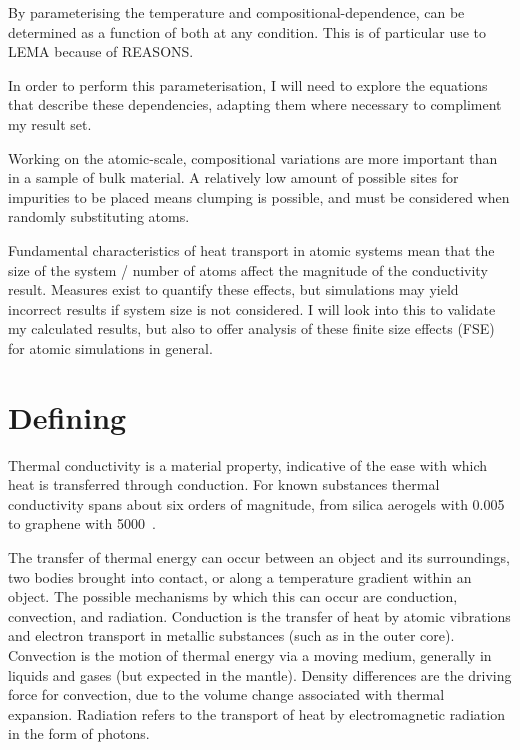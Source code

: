 By parameterising the temperature and compositional-dependence, \tcs can be determined as a function of both at any condition. This is of particular use to LEMA because of REASONS. 

In order to perform this parameterisation, I will need to explore the equations that describe these dependencies, adapting them where necessary to compliment my result set.

Working on the atomic-scale, compositional variations are more important than in a sample of bulk material. A relatively low amount of possible sites for impurities to be placed means clumping is possible, and must be considered when randomly substituting atoms.

Fundamental characteristics of heat transport in atomic systems mean that the size of the system / number of atoms affect the magnitude of the conductivity result. Measures exist to quantify these effects, but simulations may yield incorrect results if system size is not considered. I will look into this to validate my calculated results, but also to offer analysis of these finite size effects (FSE) for atomic simulations in general.





\section{Defining \tc}
\label{sec:defining_tc}

Thermal conductivity is a material property, indicative of the ease with which heat is transferred through conduction. For known substances thermal conductivity spans about six orders of magnitude, from silica aerogels with 0.005~\wmks \citep{Lee1995} to graphene with 5000~\wmks \citep{Balandin2008}.

The transfer of thermal energy can occur between an object and its surroundings, two bodies brought into contact, or along a temperature gradient within an object. The possible mechanisms by which this can occur are conduction, convection, and radiation. Conduction is the transfer of heat by atomic vibrations and electron transport in metallic substances (such as in the outer core). Convection is the motion of thermal energy via a moving medium, generally in liquids and gases (but expected in the mantle). Density differences are the driving force for convection, due to the volume change associated with thermal expansion. Radiation refers to the transport of heat by electromagnetic radiation in the form of photons.

